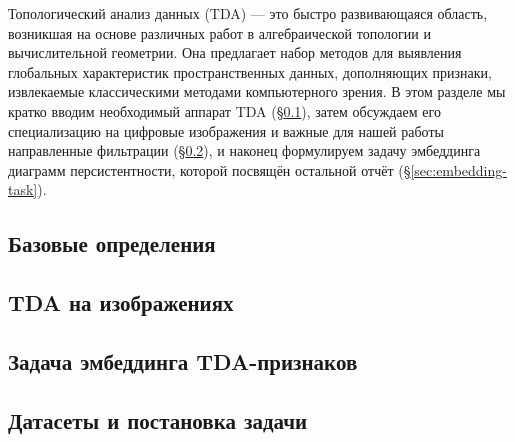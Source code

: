 Топологический анализ данных (TDA) --- это быстро развивающаяся область, возникшая на основе различных работ в алгебраической топологии и вычислительной геометрии. Она предлагает набор методов для выявления глобальных характеристик пространственных данных, дополняющих признаки, извлекаемые классическими методами компьютерного зрения. В этом разделе мы кратко вводим необходимый аппарат TDA (§\ref{ssec:basic-defs}), затем обсуждаем его специализацию на цифровые изображения и важные для нашей работы направленные фильтрации (§\ref{ssec:tda-images}), и наконец формулируем задачу эмбеддинга диаграмм персистентности, которой посвящён остальной отчёт (§\ref{sec:embedding-task}).

\subsection{Базовые определения}
\label{ssec:basic-defs}
\begin{sloppypar}
    
    \hspace{1cm}
\end{sloppypar}

\subsection{TDA на изображениях}
\label{ssec:tda-images}
\begin{sloppypar}
    
    \hspace{1cm}
\end{sloppypar}

\subsection{Задача эмбеддинга TDA-признаков}
\begin{sloppypar}
    
    \hspace{1cm}
\end{sloppypar}

\subsection{Датасеты и постановка задачи}
\begin{sloppypar}
    
    \hspace{1cm}
\end{sloppypar}
